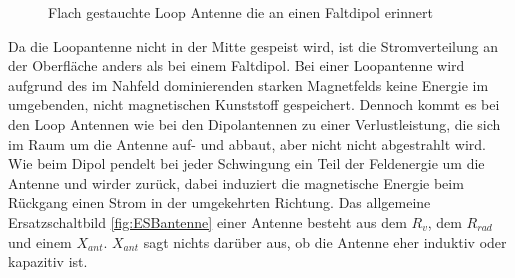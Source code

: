 \begin{figure}[!ht]
	\begin{center}
	\end{center}
\caption{Flach gestauchte Loop Antenne die an einen Faltdipol erinnert}
\label{fig:FflacheLoopAntenne}
\end{figure}
Da die Loopantenne nicht in der Mitte gespeist wird, ist die Stromverteilung an der Oberfläche anders als bei einem Faltdipol. Bei einer Loopantenne wird aufgrund des im Nahfeld dominierenden starken Magnetfelds keine Energie im umgebenden, nicht magnetischen Kunststoff gespeichert. Dennoch kommt es bei den Loop Antennen wie bei den Dipolantennen zu einer Verlustleistung, die sich im Raum um die Antenne auf- und abbaut, aber nicht nicht abgestrahlt wird. Wie beim Dipol pendelt bei jeder Schwingung ein Teil der Feldenergie um die Antenne und wirder zurück, dabei induziert die magnetische Energie beim Rückgang einen Strom in der umgekehrten Richtung. Das allgemeine Ersatzschaltbild \ref{fig:ESBantenne} einer Antenne besteht aus dem $R_{v}$, dem $R_{rad}$ und einem $X_{ant}$. $X_{ant}$ sagt nichts darüber aus, ob die Antenne eher induktiv oder kapazitiv ist. 



